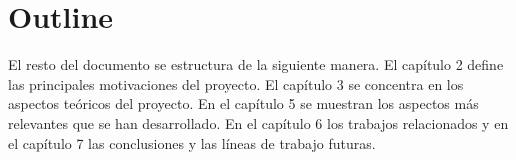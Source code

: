 \section{Outline}

El resto del documento se estructura de la siguiente manera. El capítulo 2  define las principales motivaciones del proyecto. El capítulo 3  se concentra en los aspectos teóricos del proyecto. En el capítulo 5  se muestran los aspectos
más relevantes que se han desarrollado. En el capítulo 6  los trabajos relacionados y en el capítulo 7  las conclusiones y las líneas de trabajo futuras.

